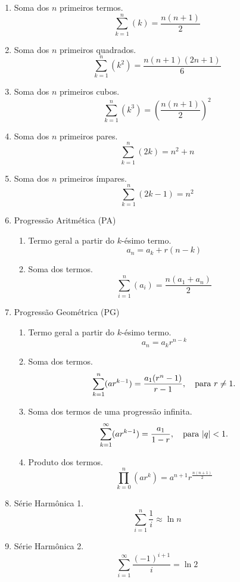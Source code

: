 \begin{multicols}{2}
	\begin{enumerate}
		\item Soma dos $n$ primeiros termos.
		      $$\sum_{k = 1}^{n} (k) = \frac{n(n+1)}{2}$$

		\item Soma dos $n$ primeiros quadrados.
		      $$\sum_{k = 1}^{n} (k^2) = \frac{n(n+1)(2n+1)}{6}$$

		\item Soma dos $n$ primeiros cubos.
		      $$\sum_{k = 1}^{n} (k^3) = (\frac{n(n+1)}{2})^{2}$$

		\item Soma dos $n$ primeiros pares.
		      $$\sum_{k = 1}^{n} (2k) = n^2 + n$$

		\item Soma dos $n$ primeiros ímpares.
		      $$\sum_{k = 1}^{n} (2k - 1) = n^2$$

		\item Progressão Aritmética (PA)
		      \begin{enumerate}
			      \item Termo geral a partir do $k$-ésimo termo.
			            $$a_n = a_k + r(n-k)$$

			      \item Soma dos termos.
			            $$\sum_{i = 1}^{n} (a_i) = \frac{n(a_1+a_n)}{2}$$
		      \end{enumerate}

		\item Progressão Geométrica (PG)
		      \begin{enumerate}
			      \item Termo geral a partir do $k$-ésimo termo.
			            $$a_n = a_k r^{n-k}$$

			      \item Soma dos termos.
			            $$\sum_{k = 1}^{n} (ar^{k-1}) = \frac{a_1(r^n - 1)}{r - 1}, \quad \textnormal{para } r \neq 1.$$

			      \item Soma dos termos de uma progressão infinita.
			            $$\sum_{k = 1}^{\infty} (ar^{k-1}) = \frac{a_1}{1 - r}, \quad \textnormal{para } |q| < 1.$$

			      \item Produto dos termos.
			            $$\prod_{k = 0}^{n} (ar^k) = a^{n+1}r^{\frac{n(n+1)}{2}}$$
		      \end{enumerate}
		
		\item Série Harmônica 1.
		$$\sum_{i=1}^{n} \frac{1}{i} \approx \ln n$$
		
		\item Série Harmônica 2.
		$$\sum_{i=1}^{\infty} \frac{(-1)^{i+1}}{i} = \ln 2$$
	\end{enumerate}
\end{multicols}
